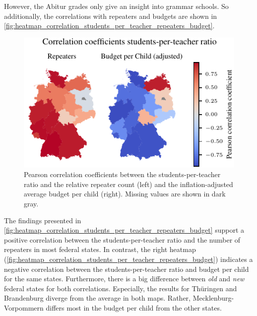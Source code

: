 However, the Abitur grades only give an insight into grammar schools. So additionally, the correlations with repeaters and budgets are shown in \autoref{fig:heatmap_correlation_students_per_teacher_repeaters_budget}. 


\begin{figure}[ht]
    \centering
    \includegraphics{fig/fig_heatmap_correlation_students_per_teacher_repeaters_budget.pdf}
    \caption{Pearson correlation coefficients between the students-per-teacher ratio and the relative repeater count (left) and the inflation-adjusted average budget per child (right). Missing values are shown in \textcolor{TUdark}{dark gray}.}
    \label{fig:heatmap_correlation_students_per_teacher_repeaters_budget}
\end{figure}

The findings presented in \autoref{fig:heatmap_correlation_students_per_teacher_repeaters_budget} support a  positive correlation between the students-per-teacher ratio and the number of repeaters in most federal states. In contrast, the right heatmap (\autoref{fig:heatmap_correlation_students_per_teacher_repeaters_budget}) indicates a negative correlation between the students-per-teacher ratio  and budget per child for the same states. Furthermore, there is a big difference between \emph{old} and \emph{new} federal states for both correlations. Especially, the results for Thüringen and Brandenburg diverge from the average in both maps. Rather, Mecklenburg-Vorpommern differs most in the budget per child from the other states.

